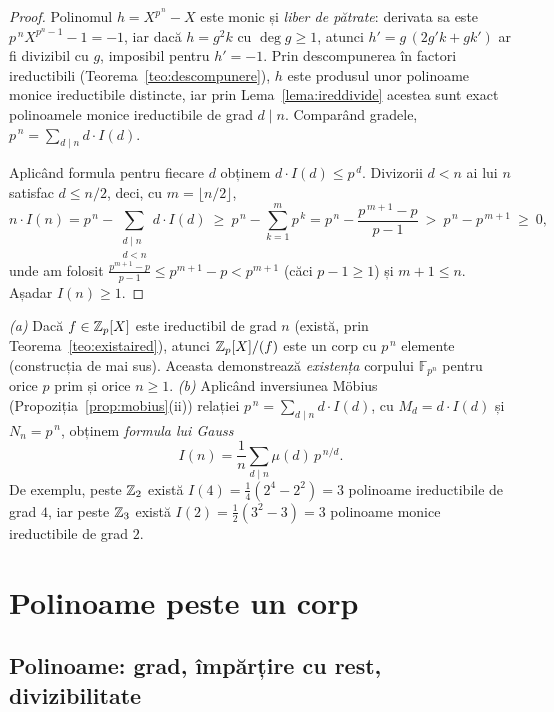 \begin{proof}
Polinomul $h=X^{p^{\,n}}-X$ este monic și \emph{liber de pătrate}: derivata sa este $p^{\,n}X^{p^n-1}-1=-1$, iar dacă $h=g^2k$ cu $\deg g\ge1$, atunci $h'=g\,(2g'k+gk')$ ar fi divizibil cu $g$, imposibil pentru $h'=-1$. Prin descompunerea în factori ireductibili (Teorema~\ref{teo:descompunere}), $h$ este produsul unor polinoame monice ireductibile distincte, iar prin Lema~\ref{lema:ireddivide} acestea sunt exact polinoamele monice ireductibile de grad $d\mid n$. Comparând gradele, $p^{\,n}=\sum_{d\mid n}d\cdot I(d)$.

Aplicând formula pentru fiecare $d$ obținem $d\cdot I(d)\le p^{\,d}$. Divizorii $d<n$ ai lui $n$ satisfac $d\le n/2$, deci, cu $m=\lfloor n/2\rfloor$,
\[
n\cdot I(n)=p^{\,n}-\sum_{\substack{d\mid n\\ d<n}}d\cdot I(d)\ \ge\ p^{\,n}-\sum_{k=1}^{m}p^{\,k}=p^{\,n}-\frac{p^{\,m+1}-p}{p-1}\ >\ p^{\,n}-p^{\,m+1}\ \ge\ 0,
\]
unde am folosit $\frac{p^{m+1}-p}{p-1}\le p^{m+1}-p<p^{m+1}$ (căci $p-1\ge1$) și $m+1\le n$. Așadar $I(n)\ge1$.
\end{proof}

\begin{observatie}\label{obs:existafpn}
\emph{(a)} Dacă $f\in\mathbb{Z}_p[X]$ este ireductibil de grad $n$ (există, prin Teorema~\ref{teo:existaired}), atunci $\mathbb{Z}_p[X]/(f)$ este un corp cu $p^{\,n}$ elemente (construcția de mai sus). Aceasta demonstrează \emph{existența} corpului $\mathbb F_{p^n}$ pentru orice $p$ prim și orice $n\ge1$.
\emph{(b)} Aplicând inversiunea Möbius (Propoziția~\ref{prop:mobius}(ii)) relației $p^{\,n}=\sum_{d\mid n}d\cdot I(d)$, cu $M_d=d\cdot I(d)$ și $N_n=p^{\,n}$, obținem \emph{formula lui Gauss}
\[
I(n)=\frac1n\sum_{d\mid n}\mu(d)\,p^{\,n/d}.
\]
De exemplu, peste $\mathbb{Z}_2$ există $I(4)=\frac14(2^4-2^2)=3$ polinoame ireductibile de grad $4$, iar peste $\mathbb{Z}_3$ există $I(2)=\frac12(3^2-3)=3$ polinoame monice ireductibile de grad $2$.
\end{observatie}

\chapter{Polinoame peste un corp}

\section{Polinoame: grad, împărțire cu rest, divizibilitate}\label{sec:polinoame}

